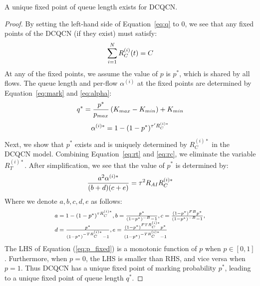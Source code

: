\begin{thm}
A unique fixed point of queue length exists for DCQCN. 
\end{thm}
\begin{proof}
By setting the left-hand side of Equation~\ref{eq:q} to 0,
we see that any fixed points of the DCQCN (if they exist) must
satisfy:
\begin{equation}
\small
\sum\limits_{i = 1}^N {R_C^{(i)}(t)} = C
\label{eq:fixedrc}
\end{equation}
At any of the fixed points, we assume the value of $p$ is $p^*$, which is shared
by all flows. The queue length and per-flow $\alpha^{(i)}$ at the fixed points
are determined by Equation~\ref{eq:mark} and \ref{eq:alpha}:
\begin{equation}
\small
{q^*} = \frac{{{p^*}}}{{{p_{max}}}}\left( {{K_{max}} - {K_{min}}} \right) + {K_{min}}
\end{equation}
\begin{equation}
\small
\alpha^{(i)*}  = 1 - {(1 - p^*)^{{\tau '}R_C^{(i)*}}}
\end{equation}
Next, we show that $p^*$ exists and is uniquely determined by $R_C^{(i)*}$ in
the DCQCN model. Combining Equation~\ref{eq:rt} and \ref{eq:rc}, 
we eliminate the variable $R_T^{(i)*}$. After simplification, we see that the value 
of $p^*$ is determined by:
\begin{equation}
\small
\frac{{{a^2}\alpha^{(i)*} }}{{(b + d)(c + e)}} = {\tau ^2}{R_{AI}}R_C^{(i)*}
\label{eq:p_fixed}
\end{equation}
Where we denote $a, b, c, d, e$ as follows:
\begin{equation}
\small
\begin{array}{l}
a = 1 - {(1 - p^*)^{\tau {R_C^{(i)*}}}},b = \frac{{p^*}}{{{{(1 - p^*)}^{ - B}} - 1}},c = \frac{{{{(1 - p^*)}^{FB}}p^*}}{{{{(1 - p^*)}^{ - B}} - 1}},\\
d = \frac{{p^*}}{{{{(1 - p^*)}^{ - T{R_C^{(i)*}}}} - 1}},e = \frac{{{{(1 - p^*)}^{FT{R_C^{(i)*}}}}p^*}}{{{{(1 - p^*)}^{ - T{R_C^{(i)*}}}} - 1}}
\end{array}
\end{equation}
The LHS of Equation (\ref{eq:p_fixed}) is a monotonic function of $p$ when $p \in [0,1]$.
Furthermore, when $p = 0$, the LHS is smaller than RHS, and vice versa when $p =
1$. Thus DCQCN has a unique fixed point of marking probability $p^*$, leading to
a unique fixed point of queue length $q^*$.
\end{proof}

